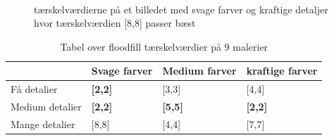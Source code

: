 \begin{figure}[!h]
    \centering
    \\
    \caption[]{tærskelværdierne på et billedet med svage farver og kraftige detaljer hvor tærskelværdien [8,8] passer bæst}
    \label{Floodfillbilledet}
\end{figure}

\begin{table}[!h]
    \centering
    \begin{tabular}{| l | l | l | l |} \hline
        & Svage farver 		& Medium farver & kraftige farver \\ \hline
        Få detalier 		& \textbf{[2,2]}	& [3,3]			& [4,4]\\ \hline
        Medium detalier 	& \textbf{[2,2]}	& \textbf{[5,5]}& \textbf{[2,2]}\\ \hline
        Mange detalier		& [8,8]				& [4,4]			& [7,7]\\ \hline
    \end{tabular}
    \caption{Tabel over floodfill tærskelværdier på 9 malerier}
    \label{thressholdsTabelFF}
\end{table}


